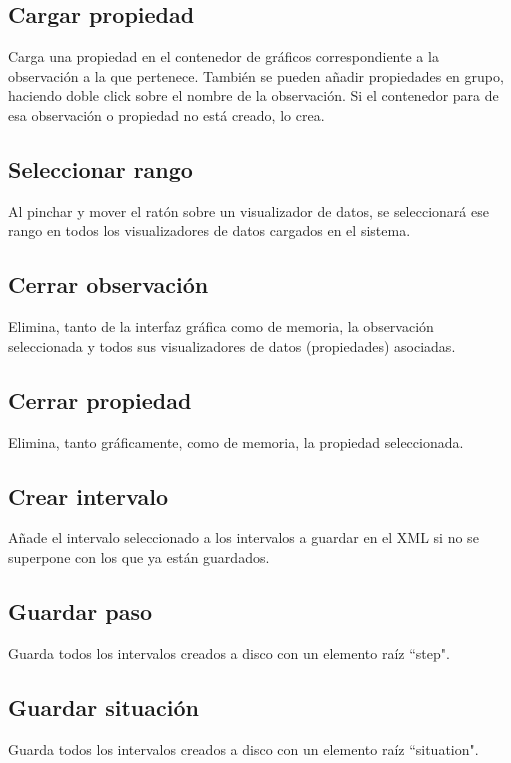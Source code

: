 \subsection{Cargar propiedad}
Carga una propiedad en el contenedor de gr\'aficos correspondiente a la observaci\'on a la que pertenece.
Tambi\'en se pueden a\~nadir propiedades en grupo, haciendo doble click sobre el nombre de la observaci\'on.
Si el contenedor para de esa observaci\'on o propiedad no est\'a creado, lo crea.

\subsection{Seleccionar rango}
Al pinchar y mover el rat\'on sobre un visualizador de datos, se seleccionar\'a ese rango en todos
los visualizadores de datos cargados en el sistema.

\subsection{Cerrar observaci\'on}
Elimina, tanto de la interfaz gr\'afica como de memoria, la observaci\'on
seleccionada y todos sus visualizadores de datos (propiedades) asociadas.

\subsection{Cerrar propiedad}
Elimina, tanto gr\'aficamente, como de memoria, la propiedad seleccionada.

\subsection{Crear intervalo}
A\~nade el intervalo seleccionado a los intervalos a guardar en el XML si no se superpone con los que
ya est\'an guardados.

\subsection{Guardar paso}
Guarda todos los intervalos creados a disco con un elemento ra\'iz ``step".

\subsection{Guardar situaci\'on}
Guarda todos los intervalos creados a disco con un elemento ra\'iz ``situation".



